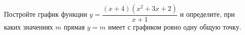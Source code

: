 \begin{ex}
	\begin{condition}
		Постройте график функции \( y=\dfrac{(x+4)(x^2+3x+2)}{x+1} \) и определите, при каких значениях \( m \) прямая \( y=m \) имеет с графиком ровно одну общую точку.
	\end{condition}
\end{ex}